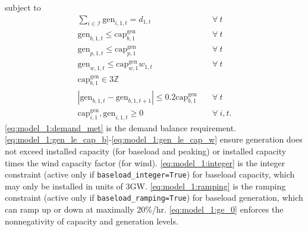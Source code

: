 \documentclass[preprint]{elsarticle}
\begin{document}
\noindent subject to
\begin{align}
\sum_{i \in \mathcal{I}} \text{gen}_{i,1,t} = d_{1,t} \quad & \forall \: t \label{eq:model_1:demand_met} \\
\text{gen}_{b,1,t} \le \text{cap}_{b,1}^\text{gen} \quad & \forall \: t \label{eq:model_1:gen_le_cap_b} \\
\text{gen}_{p,1,t} \le \text{cap}_{p,1}^\text{gen} \quad & \forall \: t \label{eq:model_1:gen_le_cap_p} \\
\text{gen}_{w,1,t} \le \text{cap}_{w,1}^\text{gen} w_{1,t} \quad & \forall \: t \label{eq:model_1:gen_le_cap_w} \\
\text{cap}_{b,1}^\text{gen} \in 3\mathbb{Z} \quad & \label{eq:model_1:integer} \\
|\text{gen}_{b,1,t} - \text{gen}_{b,1,t+1}| \le 0.2 \text{cap}_{b,1}^\text{gen} \quad & \forall \: t \label{eq:model_1:ramping} \\
\text{cap}_{i,1}^\text{gen}, \text{gen}_{i,1,t} \ge 0 \quad & \forall \: i, t. \label{eq:model_1:ge_0}
\end{align}
\noindent \eqref{eq:model_1:demand_met} is the demand balance requirement. \eqref{eq:model_1:gen_le_cap_b}-\eqref{eq:model_1:gen_le_cap_w} ensure generation does not exceed installed capacity (for baseload and peaking) or installed capacity times the wind capacity factor (for wind). \eqref{eq:model_1:integer} is the integer constraint (active only if \texttt{baseload\_integer=True}) for baseload capacity, which may only be installed in units of 3GW. \eqref{eq:model_1:ramping} is the ramping constraint (active only if \texttt{baseload\_ramping=True}) for baseload generation, which can ramp up or down at maximally 20\%/hr. \eqref{eq:model_1:ge_0} enforces the nonnegativity of capacity and generation levels.
\end{document}
